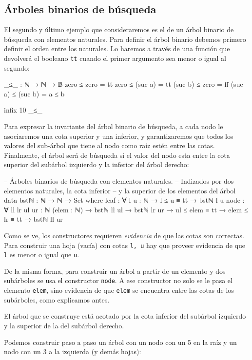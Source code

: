 \documentclass[11pt]{article} %
\begin{document}
\subsection{Árboles binarios de búsqueda}
El segundo y último ejemplo que consideraremos es el de un árbol binario de búsqueda con elementos naturales. Para definir el árbol binario debemos primero definir el orden entre los naturales. Lo haremos a través de una función que devolverá el booleano \verb|tt| cuando el primer argumento sea menor o igual al segundo:

\begin{code}
_≤_ : ℕ → ℕ → 𝔹
zero ≤ zero = tt
zero ≤ (suc a) = tt
(suc b) ≤ zero = ff
(suc a) ≤ (suc b) = a ≤ b

infix 10 _≤_
\end{code}

Para expresar la invariante del árbol binario de búsqueda, a cada nodo le asociaremos una cota superior y una inferior, y garantizaremos que todos los valores del sub-árbol que tiene al nodo como raíz estén entre las cotas. Finalmente, el árbol será de búsqueda si el valor del nodo esta entre la cota superior del subárbol izquierdo y la inferior del árbol derecho:

\begin{code}
-- Árboles binarios de búsqueda con elementos naturales.
-- Indizados por dos elementos naturales, la cota inferior
-- y la superior de los elementos del árbol
data bstℕ : ℕ → ℕ → Set where
    leaf : ∀ {l u : ℕ} → l ≤ u ≡ tt → bstℕ l u
    node : ∀ {ll lr ul ur : ℕ} 
                (elem : ℕ) → bstℕ ll ul → bstℕ lr ur →
                ul ≤ elem ≡ tt → elem ≤ lr ≡ tt →
                bstℕ ll ur
\end{code}

Como se ve, los constructores requieren \textit{evidencia} de que las cotas son correctas. Para construir una hoja (vacía) con cotas \verb|l, u| hay que proveer evidencia de que \verb|l| es menor o igual que \verb|u|. 

De la misma forma, para construir un árbol a partir de un elemento y dos subárboles se usa el constructor \verb|node|. A ese constructor no solo se le pasa el elemento \verb|elem|, sino evidencia de que \verb|elem| se encuentra entre las cotas de los subárboles, como explicamos antes. 

El árbol que se construye está acotado por la cota inferior del subárbol izquierdo y la superior de la del subárbol derecho.

Podemos construir paso a paso un árbol con un nodo con un 5 en la raíz y un nodo con un 3 a la izquierda (y demás hojas):
\end{document}
